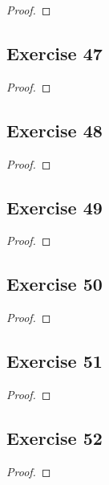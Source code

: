 \documentclass[14pt]{extarticle}
\begin{document}
\begin{proof}

\end{proof}

\subsection{Exercise 47}

\begin{proof}

\end{proof}

\subsection{Exercise 48}

\begin{proof}

\end{proof}

\subsection{Exercise 49}

\begin{proof}

\end{proof}

\subsection{Exercise 50}

\begin{proof}

\end{proof}

\subsection{Exercise 51}

\begin{proof}

\end{proof}

\subsection{Exercise 52}

\begin{proof}

\end{proof}
\end{document}
